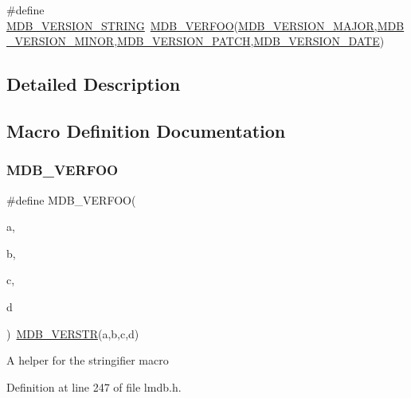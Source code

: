 \begin{DoxyCompactItemize}
\item 
\#define \mbox{\hyperlink{group___version_ga44546ec3a3ab85addf079124ef4af21e}{M\+D\+B\+\_\+\+V\+E\+R\+S\+I\+O\+N\+\_\+\+S\+T\+R\+I\+NG}}~\mbox{\hyperlink{group___version_ga9e259368ceadd84622c214f0c7442970}{M\+D\+B\+\_\+\+V\+E\+R\+F\+OO}}(\mbox{\hyperlink{group___version_ga4d29d48a85ec25636fac7831b8b9b807}{M\+D\+B\+\_\+\+V\+E\+R\+S\+I\+O\+N\+\_\+\+M\+A\+J\+OR}},\mbox{\hyperlink{group___version_ga44da0474969d76ad5521f8b7de4dd32f}{M\+D\+B\+\_\+\+V\+E\+R\+S\+I\+O\+N\+\_\+\+M\+I\+N\+OR}},\mbox{\hyperlink{group___version_gaeddac7231e1cdcbe2b7541cbfa33e82a}{M\+D\+B\+\_\+\+V\+E\+R\+S\+I\+O\+N\+\_\+\+P\+A\+T\+CH}},\mbox{\hyperlink{group___version_ga24212e54d8dc0e0949970b5995b3b663}{M\+D\+B\+\_\+\+V\+E\+R\+S\+I\+O\+N\+\_\+\+D\+A\+TE}})
\end{DoxyCompactItemize}


\subsection{Detailed Description}


\subsection{Macro Definition Documentation}
\mbox{\label{group___version_ga9e259368ceadd84622c214f0c7442970}} 
\subsubsection{\texorpdfstring{M\+D\+B\+\_\+\+V\+E\+R\+F\+OO}{MDB\_VERFOO}}
{\footnotesize\ttfamily \#define M\+D\+B\+\_\+\+V\+E\+R\+F\+OO(\begin{DoxyParamCaption}\item[{}]{a,  }\item[{}]{b,  }\item[{}]{c,  }\item[{}]{d }\end{DoxyParamCaption})~\mbox{\hyperlink{group___version_ga1e8ad3b918e27a5a55179c1ab4b2e0d1}{M\+D\+B\+\_\+\+V\+E\+R\+S\+TR}}(a,b,c,d)}

A helper for the stringifier macro 

Definition at line 247 of file lmdb.\+h.

